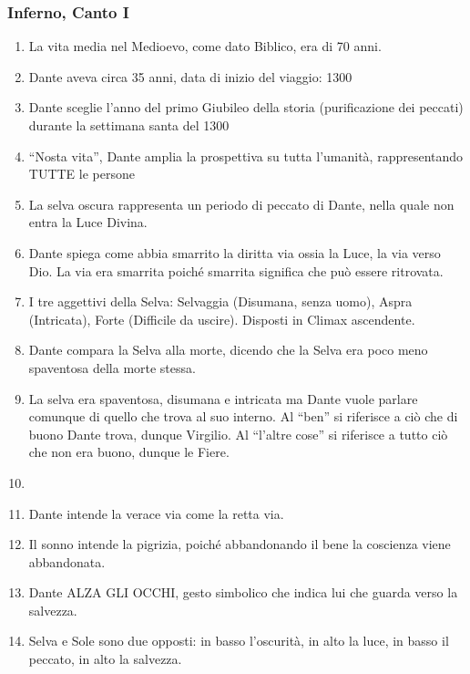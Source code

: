 \documentclass{article}
\begin{document}
\subsubsection{Inferno, Canto I}
\begin{enumerate}
    \item La vita media nel Medioevo, come dato Biblico, era di 70 anni.
    \item Dante aveva circa 35 anni, data di inizio del viaggio: 1300
    \item Dante sceglie l'anno del primo Giubileo della storia (purificazione dei peccati)
        durante la settimana santa del 1300
    \item ``Nosta vita'', Dante amplia la prospettiva su tutta l'umanità, rappresentando TUTTE
        le persone
    \item La selva oscura rappresenta un periodo di peccato di Dante, nella quale non entra la Luce Divina.
    \item Dante spiega come abbia smarrito la diritta via ossia la Luce, la via verso Dio. 
        La via era smarrita poiché smarrita significa che può essere ritrovata.
    \item I tre aggettivi della Selva: Selvaggia (Disumana, senza uomo), Aspra (Intricata), Forte (Difficile da uscire). Disposti in Climax ascendente.
    \item Dante compara la Selva alla morte, dicendo che la Selva era poco meno spaventosa della morte stessa.
    \item La selva era spaventosa, disumana e intricata ma Dante vuole parlare comunque di quello che trova al suo interno. 
        Al ``ben'' si riferisce a ciò che di buono Dante trova, dunque Virgilio. Al ``l'altre cose'' si riferisce a tutto ciò che non era buono, dunque le Fiere.
    \item {\color{red}{Con la prospettiva ampliata si può chiudere il capitolo della Vita nova, poiché la privatissima vita amorosa di Dante viene ampliata con tutti i conoscenti di Dio che incontrerà e con tutto lo spazio percorso}}
    \item Dante intende la verace via come la retta via.
    \item Il sonno intende la pigrizia, poiché abbandonando il bene la coscienza viene abbandonata.
    \item Dante ALZA GLI OCCHI, gesto simbolico che indica lui che guarda verso la salvezza.
    \item Selva e Sole sono due opposti: in basso l'oscurità, in alto la luce, in basso il peccato, in alto la salvezza.

\end{enumerate}
\end{document}
